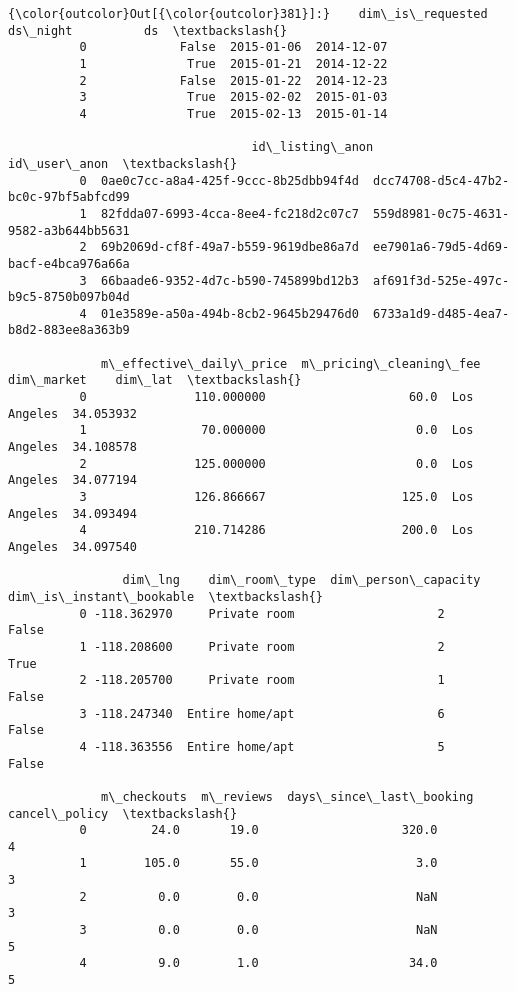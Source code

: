 \documentclass[11pt]{article}
\begin{document}
\begin{Verbatim}[commandchars=\\\{\}]
{\color{outcolor}Out[{\color{outcolor}381}]:}    dim\_is\_requested    ds\_night          ds  \textbackslash{}
          0             False  2015-01-06  2014-12-07   
          1              True  2015-01-21  2014-12-22   
          2             False  2015-01-22  2014-12-23   
          3              True  2015-02-02  2015-01-03   
          4              True  2015-02-13  2015-01-14   
          
                                  id\_listing\_anon                          id\_user\_anon  \textbackslash{}
          0  0ae0c7cc-a8a4-425f-9ccc-8b25dbb94f4d  dcc74708-d5c4-47b2-bc0c-97bf5abfcd99   
          1  82fdda07-6993-4cca-8ee4-fc218d2c07c7  559d8981-0c75-4631-9582-a3b644bb5631   
          2  69b2069d-cf8f-49a7-b559-9619dbe86a7d  ee7901a6-79d5-4d69-bacf-e4bca976a66a   
          3  66baade6-9352-4d7c-b590-745899bd12b3  af691f3d-525e-497c-b9c5-8750b097b04d   
          4  01e3589e-a50a-494b-8cb2-9645b29476d0  6733a1d9-d485-4ea7-b8d2-883ee8a363b9   
          
             m\_effective\_daily\_price  m\_pricing\_cleaning\_fee   dim\_market    dim\_lat  \textbackslash{}
          0               110.000000                    60.0  Los Angeles  34.053932   
          1                70.000000                     0.0  Los Angeles  34.108578   
          2               125.000000                     0.0  Los Angeles  34.077194   
          3               126.866667                   125.0  Los Angeles  34.093494   
          4               210.714286                   200.0  Los Angeles  34.097540   
          
                dim\_lng    dim\_room\_type  dim\_person\_capacity  dim\_is\_instant\_bookable  \textbackslash{}
          0 -118.362970     Private room                    2                    False   
          1 -118.208600     Private room                    2                     True   
          2 -118.205700     Private room                    1                    False   
          3 -118.247340  Entire home/apt                    6                    False   
          4 -118.363556  Entire home/apt                    5                    False   
          
             m\_checkouts  m\_reviews  days\_since\_last\_booking  cancel\_policy  \textbackslash{}
          0         24.0       19.0                    320.0              4   
          1        105.0       55.0                      3.0              3   
          2          0.0        0.0                      NaN              3   
          3          0.0        0.0                      NaN              5   
          4          9.0        1.0                     34.0              5   
          

\end{Verbatim}
\end{document}
